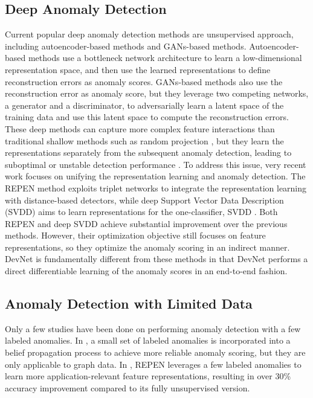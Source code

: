 \documentclass[sigconf]{acmart}
\begin{document}
\subsection{Deep Anomaly Detection}


Current popular deep anomaly detection methods are unsupervised approach, including autoencoder-based methods and GANs-based methods. Autoencoder-based methods \cite{hawkins2002autoencoder,chen2017autoencoder,zhou2017autoencoder} use a bottleneck network architecture to learn a low-dimensional representation space, and then use the learned representations to define reconstruction errors as anomaly scores. GANs-based methods \cite{schlegl2017gan,zenati2018gan} also use the reconstruction error as anomaly score, but they leverage two competing networks, a generator and a discriminator, to adversarially learn a latent space of the training data and use this latent space to compute the reconstruction errors. These deep methods can capture more complex feature interactions than traditional shallow methods such as random projection \cite{li2006srp}, but they learn the representations separately from the subsequent anomaly detection, leading to suboptimal or unstable detection performance \cite{pang2018repen,ruff2018deepsvdd}. To address this issue, very recent work \cite{pang2018repen,ruff2018deepsvdd} focuses on unifying the representation learning and anomaly detection. The REPEN method \cite{pang2018repen} exploits triplet networks to integrate the representation learning with distance-based detectors, while deep Support Vector Data Description (SVDD) \cite{ruff2018deepsvdd} aims to learn representations for the one-classifier, SVDD \cite{tax2004svdd}. Both REPEN and deep SVDD achieve substantial improvement over the previous methods. However, their optimization objective still focuses on feature representations, so they optimize the anomaly scoring in an indirect manner. DevNet is fundamentally different from these methods in that DevNet performs a direct differentiable learning of the anomaly scores in an end-to-end fashion.



\subsection{Anomaly Detection with Limited Data}
Only a few studies have been done on performing anomaly detection with a few labeled anomalies. In \cite{mcglohon2009snare,tamersoy2014guilt}, a small set of labeled anomalies is incorporated into a belief propagation process to achieve more reliable anomaly scoring, but they are only applicable to graph data. In \cite{pang2018repen}, REPEN leverages a few labeled anomalies to learn more application-relevant feature representations, resulting in over 30\% accuracy improvement compared to its fully unsupervised version.
\end{document}
